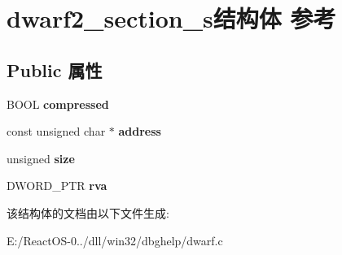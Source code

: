 \hypertarget{structdwarf2__section__s}{}\section{dwarf2\+\_\+section\+\_\+s结构体 参考}
\label{structdwarf2__section__s}
\subsection*{Public 属性}
\begin{DoxyCompactItemize}
\item 
\mbox{\label{structdwarf2__section__s_a2d1e84a1402ff2146311ea2e0ff9b352}} 
B\+O\+OL {\bfseries compressed}
\item 
\mbox{\label{structdwarf2__section__s_ac3adde19fc46c6b3cce0009632751eee}} 
const unsigned char $\ast$ {\bfseries address}
\item 
\mbox{\label{structdwarf2__section__s_abe1c1c88383fcde8d34a50678dde4fb3}} 
unsigned {\bfseries size}
\item 
\mbox{\label{structdwarf2__section__s_a3c9f465957198f7eac6e47003f8d5a37}} 
D\+W\+O\+R\+D\+\_\+\+P\+TR {\bfseries rva}
\end{DoxyCompactItemize}


该结构体的文档由以下文件生成\+:\begin{DoxyCompactItemize}
\item 
E\+:/\+React\+O\+S-\/0../dll/win32/dbghelp/dwarf.\+c\end{DoxyCompactItemize}
